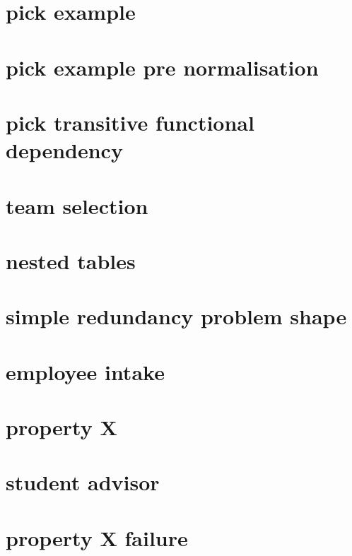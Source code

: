 \documentclass[10pt,a4paper]{article}
\begin{document}
\section{pick example}


\section{pick example pre normalisation}


\section{pick transitive functional dependency}


\section{team selection}


\iffalse
\needspace{20\baselineskip}
\section{nested rows}

\fi

\section{nested tables}


\section{simple redundancy problem shape}


\section{employee intake}


\section{property X}


\section{student advisor}


\section{property X failure}

\end{document}
